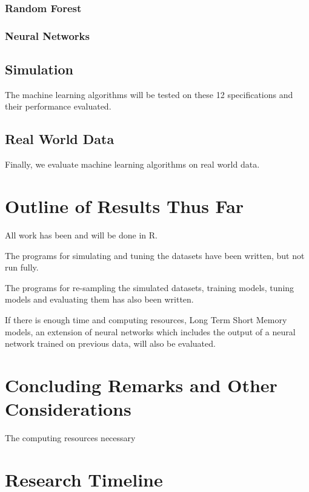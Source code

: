 \documentclass[a4paper]{article}
\begin{document}
\subsubsection{Random Forest}

\subsubsection{Neural Networks}

\subsection{Simulation}

The machine learning algorithms will be tested on these 12 specifications and their performance evaluated.

\subsection{Real World Data}

Finally, we evaluate machine learning algorithms on real world data. 

\section{Outline of Results Thus Far}

All work has been and will be done in R.

The programs for simulating and tuning the datasets have been written, but not run fully.

The programs for re-sampling the simulated datasets, training models, tuning models and evaluating them has also been written.

If there is enough time and computing resources, Long Term Short Memory models, an extension of neural networks which includes the output of a neural network trained on previous data, will also be evaluated.

\section{Concluding Remarks and Other Considerations}

The computing resources necessary 

\section{Research Timeline}
\end{document}

